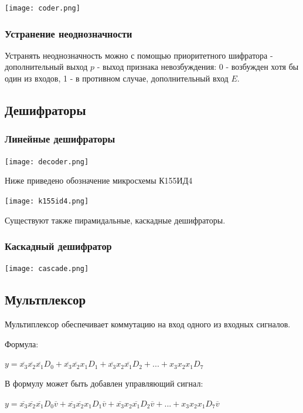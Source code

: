 \documentclass{article}
\begin{document}
\begin{flushleft}

\texttt{[image: coder.png]}

\subsubsection{Устранение неоднозначности}

Устранять неоднозначность можно с помощью приоритетного шифратора - дополнительный выход $p$ - выход признака невозбуждения: 0 - возбужден хотя бы один из входов, 1 - в противном случае, дополнительный вход $E$.

\subsection{Дешифраторы}

\subsubsection{Линейные дешифраторы}

\texttt{[image: decoder.png]}

\hfill

Ниже приведено обозначение микросхемы К155ИД4

\hfill

\texttt{[image: k155id4.png]}

Существуют также пирамидальные, каскадные дешифраторы.

\subsubsection{Каскадный дешифратор}

\texttt{[image: cascade.png]}

\subsection{Мультплексор}

Мультиплексор обеспечивает коммутацию на вход одного из входных сигналов.

Формула:

$y = \overline{x_3}\overline{x_2}\overline{x_1}D_0 + \overline{x_3}\overline{x_2}x_1D_1 + \overline{x_3}x_2\overline{x_1}D_2 + ... + x_3x_2x_1D_7$

\hfill

В формулу может быть добавлен управляющий сигнал:

$y = \overline{x_3}\overline{x_2}\overline{x_1}D_0\overline{v} + \overline{x_3}\overline{x_2}x_1D_1\overline{v} + \overline{x_3}x_2\overline{x_1}D_2\overline{v} + ... + x_3x_2x_1D_7\overline{v}$


\end{flushleft}
\end{document}
